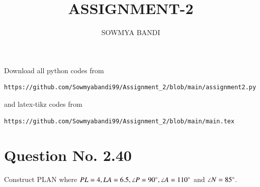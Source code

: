 \documentclass[journal,12pt,twocolumn]{IEEEtran}
\begin{document}
     \def\centbox#1{\makebox[0in]{#1}}
     \def\topbox#1{\raisebox{-\baselineskip}[0in][0in]{#1}}
     \def\midbox#1{\raisebox{-0.5\baselineskip}[0in][0in]{#1}}
\vspace{3cm}
\title{ASSIGNMENT-2}
\author{SOWMYA BANDI}
\maketitle
\newpage
\bigskip
\renewcommand{\thefigure}{\theenumi}
\renewcommand{\thetable}{\theenumi}
Download all python codes from 
\begin{lstlisting}
https://github.com/Sowmyabandi99/Assignment_2/blob/main/assignment2.py
\end{lstlisting}
%
and latex-tikz codes from 
%
\begin{lstlisting}
https://github.com/Sowmyabandi99/Assignment_2/blob/main/main.tex
\end{lstlisting}
%
\section{Question No. 2.40}
Construct PLAN where $PL = 4, LA = 6.5, \angle P = 90 \degree, \angle A = 110 \degree$ and $\angle N = 85 \degree$.
%
\end{document}
